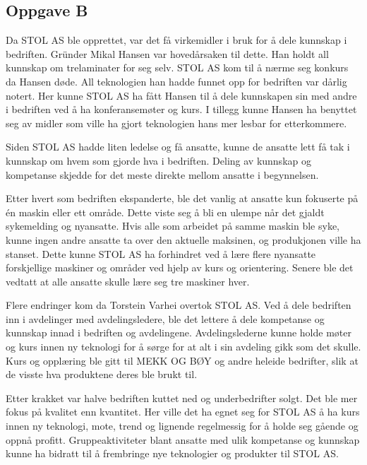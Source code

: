 \subsection{Oppgave B}
Da STOL AS ble opprettet, var det få virkemidler i bruk for å dele kunnskap i bedriften. 
Gründer Mikal Hansen var hovedårsaken til dette.
Han holdt all kunnskap om trelaminater for seg selv. STOL AS kom til å nærme seg konkurs da Hansen døde.
All teknologien han hadde funnet opp for bedriften var dårlig notert.
Her kunne STOL AS ha fått Hansen til å dele kunnskapen sin med andre i bedriften ved å ha konferansemøter og kurs.
I tillegg kunne Hansen ha benyttet seg av midler som ville ha gjort teknologien hans mer lesbar for etterkommere.

Siden STOL AS hadde liten ledelse og få ansatte, kunne de ansatte lett få tak i kunnskap om hvem som gjorde hva i bedriften.
Deling av kunnskap og kompetanse skjedde for det meste direkte mellom ansatte i begynnelsen.

Etter hvert som bedriften ekspanderte, ble det vanlig at ansatte kun fokuserte på én maskin eller ett område.
Dette viste seg å bli en ulempe når det gjaldt sykemelding og nyansatte.
Hvis alle som arbeidet på samme maskin ble syke, kunne ingen andre ansatte ta over den aktuelle maksinen, og produkjonen ville ha stanset.
Dette kunne STOL AS ha forhindret ved å lære flere nyansatte forskjellige maskiner og områder ved hjelp av kurs og orientering.
Senere ble det vedtatt at alle ansatte skulle lære seg tre maskiner hver.

Flere endringer kom da Torstein Varhei overtok STOL AS.
Ved å dele bedriften inn i avdelinger med avdelingsledere, ble det lettere å dele kompetanse og kunnskap innad i bedriften og avdelingene.
Avdelingslederne kunne holde møter og kurs innen ny teknologi for å sørge for at alt i sin avdeling gikk som det skulle.
Kurs og opplæring ble gitt til MEKK OG BØY og andre heleide bedrifter, slik at de visste hva produktene deres ble brukt til.

Etter krakket var halve bedriften kuttet ned og underbedrifter solgt. Det ble mer fokus på kvalitet enn kvantitet.
Her ville det ha egnet seg for STOL AS å ha kurs innen ny teknologi, mote, trend og lignende regelmessig for å holde seg gående og oppnå profitt.
Gruppeaktiviteter blant ansatte med ulik kompetanse og kunnskap kunne ha bidratt til å frembringe nye teknologier og produkter til STOL AS.
